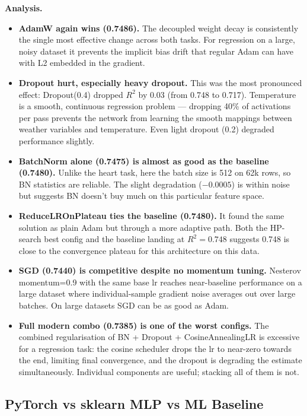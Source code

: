 \documentclass[11pt,a4paper]{article}
\begin{document}
\textbf{Analysis.}

\begin{itemize}[leftmargin=1.2em,itemsep=0.15em]
    \item \textbf{AdamW again wins (0.7486).} The decoupled weight decay is consistently the single most effective change across both tasks. For regression on a large, noisy dataset it prevents the implicit bias drift that regular Adam can have with L2 embedded in the gradient.
    \item \textbf{Dropout hurt, especially heavy dropout.} This was the most pronounced effect: Dropout(0.4) dropped $R^2$ by 0.03 (from 0.748 to 0.717). Temperature is a smooth, continuous regression problem --- dropping 40\% of activations per pass prevents the network from learning the smooth mappings between weather variables and temperature. Even light dropout (0.2) degraded performance slightly.
    \item \textbf{BatchNorm alone (0.7475) is almost as good as the baseline (0.7480).} Unlike the heart task, here the batch size is 512 on 62k rows, so BN statistics are reliable. The slight degradation ($-0.0005$) is within noise but suggests BN doesn't buy much on this particular feature space.
    \item \textbf{ReduceLROnPlateau ties the baseline (0.7480).} It found the same solution as plain Adam but through a more adaptive path. Both the HP-search best config and the baseline landing at $R^2=0.748$ suggests 0.748 is close to the convergence plateau for this architecture on this data.
    \item \textbf{SGD (0.7440) is competitive despite no momentum tuning.} Nesterov momentum=0.9 with the same base lr reaches near-baseline performance on a large dataset where individual-sample gradient noise averages out over large batches. On large datasets SGD can be as good as Adam.
    \item \textbf{Full modern combo (0.7385) is one of the worst configs.} The combined regularisation of BN + Dropout + CosineAnnealingLR is excessive for a regression task: the cosine scheduler drops the lr to near-zero towards the end, limiting final convergence, and the dropout is degrading the estimate simultaneously. Individual components are useful; stacking all of them is not.
\end{itemize}

\subsection{PyTorch vs sklearn MLP vs ML Baseline}
\end{document}
